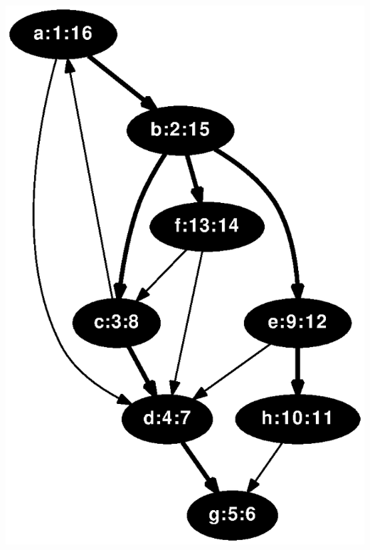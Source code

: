 \documentclass{article}
\begin{document}
\includegraphics[height=.3\textheight]{dfs_directed_classroom_16.eps}
\end{document}
